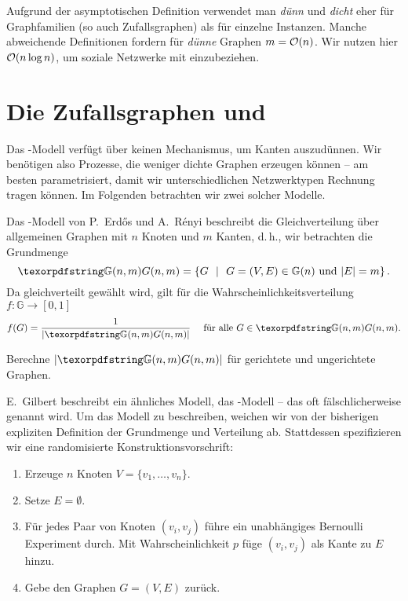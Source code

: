 \begin{remark}
    Aufgrund der asymptotischen Definition verwendet man \emph{dünn} und \emph{dicht} eher für Graphfamilien (so auch Zufallsgraphen) als für einzelne Instanzen.
    Manche abweichende Definitionen fordern für \emph{dünne} Graphen $m = \mathcal{O}\!\left(n\right)$.
    Wir nutzen hier $\mathcal{O}\!\left(n\log n\right)$, um soziale Netzwerke mit einzubeziehen.
\end{remark}

\section{Die Zufallsgraphen \Gnm und \Gnp}
Das \Gn-Modell verfügt über keinen Mechanismus, um Kanten auszudünnen.
Wir benötigen also Prozesse, die weniger dichte Graphen erzeugen können --
am besten parametrisiert, damit wir unterschiedlichen Netzwerktypen Rechnung tragen können.
Im Folgenden betrachten wir zwei solcher Modelle.

Das \Gnm-Modell  von P.~Erd\H{o}s und A.~R\'enyi beschreibt die Gleichverteilung über allgemeinen Graphen mit $n$ Knoten und $m$ Kanten, d.\,h., wir betrachten die Grundmenge
\begin{equation}
    \gGnm = \twoset{G}{G=(V,E) \in \mathbb G(n) \textnormal{ und } |E| = m}.
\end{equation}
Da gleichverteilt gewählt wird, gilt für die Wahrscheinlichkeitsverteilung~{$f\colon \mathbb G \to [0,1]$}
\begin{equation}
    f(G) = \frac{1}{| \gGnm |} \quad \text{ für alle } G \in \gGnm.
\end{equation}

\begin{exercise}
    Berechne $|\gGnm|$ für gerichtete und ungerichtete Graphen.
\end{exercise}

E.~Gilbert  beschreibt ein ähnliches Modell, das \Gnp-Modell -- das oft fälschlicherweise  genannt wird.
Um das Modell zu beschreiben, weichen wir von der bisherigen expliziten Definition der Grundmenge und Verteilung ab.
Stattdessen spezifizieren wir eine randomisierte Konstruktionsvorschrift:
\begin{enumerate}
    \item Erzeuge $n$ Knoten $V = \{v_1, \ldots, v_n\}$.
    \item Setze $E = \emptyset$.
    \item Für jedes Paar von Knoten $(v_i, v_j)$ führe ein unabhängiges Bernoulli Experiment durch.
          Mit Wahrscheinlichkeit $p$ füge $(v_i, v_j)$ als Kante zu $E$ hinzu.
    \item Gebe den Graphen $G=(V, E)$ zurück.
\end{enumerate}

